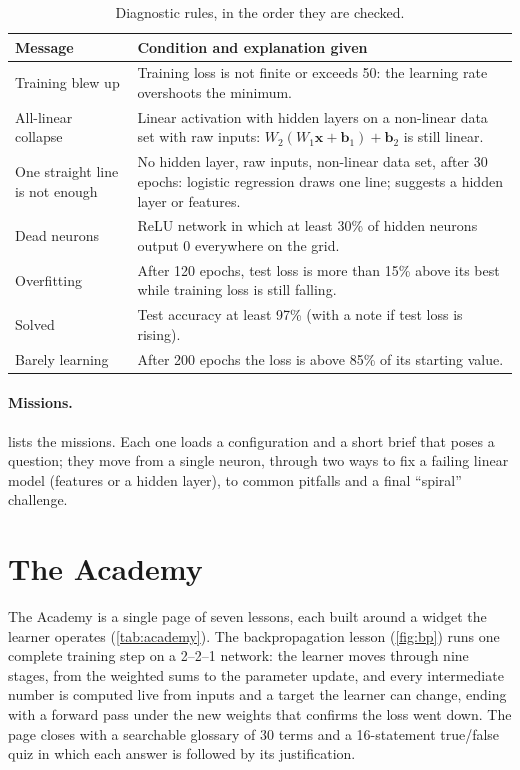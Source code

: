 \documentclass[11pt,a4paper]{article}
\begin{document}
\begin{table}[!htbp]
\centering\small
\caption{Diagnostic rules, in the order they are checked.}\label{tab:rules}
\begin{tabularx}{\textwidth}{l >{\raggedright\arraybackslash}X}
\toprule
Message & Condition and explanation given \\
\midrule
Training blew up & Training loss is not finite or exceeds 50: the learning rate overshoots the minimum. \\
All-linear collapse & Linear activation with hidden layers on a non-linear data set with raw inputs: $W_2(W_1\mathbf{x} + \mathbf{b}_1) + \mathbf{b}_2$ is still linear. \\
One straight line is not enough & No hidden layer, raw inputs, non-linear data set, after 30 epochs: logistic regression draws one line; suggests a hidden layer or features. \\
Dead neurons & ReLU network in which at least 30\% of hidden neurons output 0 everywhere on the grid. \\
Overfitting & After 120 epochs, test loss is more than 15\% above its best while training loss is still falling. \\
Solved & Test accuracy at least 97\% (with a note if test loss is rising). \\
Barely learning & After 200 epochs the loss is above 85\% of its starting value. \\
\bottomrule
\end{tabularx}
\end{table}

\paragraph{Missions.}  lists the \nMissions{} missions. Each one loads a configuration and a short brief that poses a question; they move from a single neuron, through two ways to fix a failing linear model (features or a hidden layer), to common pitfalls and a final ``spiral'' challenge.

\section{The Academy}\label{sec:academy}

The Academy is a single page of seven lessons, each built around a widget the learner operates (\cref{tab:academy}). The backpropagation lesson (\cref{fig:bp}) runs one complete training step on a 2--2--1 network: the learner moves through nine stages, from the weighted sums to the parameter update, and every intermediate number is computed live from inputs and a target the learner can change, ending with a forward pass under the new weights that confirms the loss went down. The page closes with a searchable glossary of 30 terms and a 16-statement true/false quiz in which each answer is followed by its justification.
\end{document}
